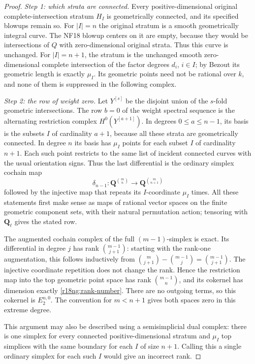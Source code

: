 \begin{proof}
\emph{Step 1: which strata are connected.}
Every positive-dimensional original complete-intersection
stratum $H_I$ is geometrically connected, and its specified
blowups remain so.  For $|I|=n$ the original stratum is a
smooth geometrically integral curve.  The NF18 blowup
centers on it are empty, because they would be intersections
of $Q$ with zero-dimensional original strata.  Thus this
curve is unchanged.  For $|I|=n+1$, the stratum is the
unchanged smooth zero-dimensional complete intersection
of the factor degrees $d_i$, $i\in I$; by Bezout its
geometric length is exactly $\mu_I$.  Its geometric
points need not be rational over $k$, and none of them
is suppressed in the following complex.

\emph{Step 2: the row of weight zero.}
Let $Y^{[s]}$ be the disjoint union of the $s$-fold
geometric intersections.  The row $b=0$ of the weight
spectral sequence is the alternating restriction complex
$H^0(Y^{[a+1]})$.  In degrees $0\le a\le n-1$, its
basis is the subsets $I$ of cardinality $a+1$, because
all these strata are geometrically connected.  In degree
$n$ its basis has $\mu_I$ points for each subset $I$ of
cardinality $n+1$.  Each such point restricts to the
same list of incident connected curves with the usual
orientation signs.  Thus the last differential is the
ordinary simplex cochain map
\[
 \delta_{n-1}:\mathbf Q^{\binom mn}
                     \longrightarrow\mathbf Q^{\binom m{n+1}}
\]
followed by the injective map that repeats its $I$-coordinate
$\mu_I$ times.  All these statements first make sense as
maps of rational vector spaces on the finite geometric
component sets, with their natural permutation action;
tensoring with $\mathbf Q_\ell$ gives the stated row.

The augmented cochain complex of the full $(m-1)$-simplex
is exact.  Its differential in degree $j$ has rank
$\binom{m-1}{j+1}$: starting with the rank-one augmentation,
this follows inductively from
$\binom m{j+1}-\binom{m-1}j=\binom{m-1}{j+1}$.
The injective coordinate repetition does not change the
rank.  Hence the restriction map into the top geometric
point space has rank $\binom{m-1}n$, and its cokernel
has dimension exactly \eqref{r18ng:rank-number}.
There are no outgoing terms, so this cokernel is
$E_2^{n,0}$.  The convention for $m<n+1$ gives both
spaces zero in this extreme degree.

This argument may also be described using a semisimplicial
dual complex: there is one simplex for every connected
positive-dimensional stratum and $\mu_I$ top simplices
with the same boundary for each $I$ of size $n+1$.
Calling this a single ordinary simplex for each such
$I$ would give an incorrect rank.


\end{proof}
